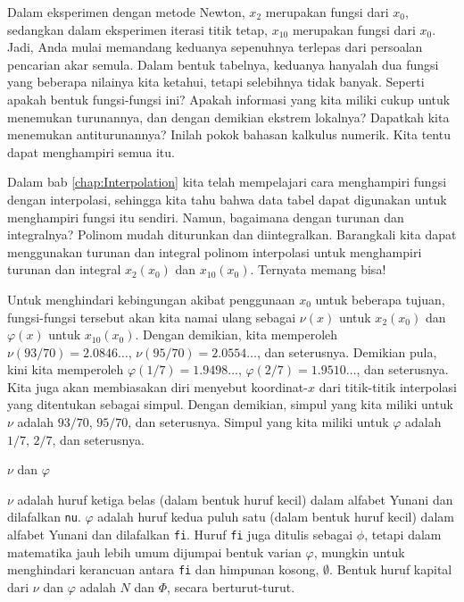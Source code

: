 Dalam eksperimen dengan metode Newton, $x_{2}$ merupakan fungsi dari
$x_{0}$, sedangkan dalam eksperimen iterasi titik tetap, $x_{10}$
merupakan fungsi dari $x_{0}$. Jadi, Anda mulai memandang keduanya
sepenuhnya terlepas dari persoalan pencarian akar semula. Dalam bentuk
tabelnya, keduanya hanyalah dua fungsi yang beberapa nilainya kita
ketahui, tetapi selebihnya tidak banyak. Seperti apakah bentuk fungsi-fungsi
ini? Apakah informasi yang kita miliki cukup untuk menemukan turunannya,
dan dengan demikian ekstrem lokalnya? Dapatkah kita menemukan antiturunannya?
Inilah pokok bahasan kalkulus numerik. Kita tentu dapat menghampiri
semua itu. 

Dalam bab \ref{chap:Interpolation} kita telah mempelajari cara menghampiri
fungsi dengan interpolasi, sehingga kita tahu bahwa data tabel dapat
digunakan untuk menghampiri fungsi itu sendiri. Namun, bagaimana dengan
turunan dan integralnya? Polinom mudah diturunkan dan diintegralkan.
Barangkali kita dapat menggunakan turunan dan integral polinom interpolasi
untuk menghampiri turunan dan integral $x_{2}(x_{0})$ dan $x_{10}(x_{0})$.
Ternyata memang bisa! 

Untuk menghindari kebingungan akibat penggunaan $x_{0}$ untuk beberapa
tujuan, fungsi-fungsi tersebut akan kita namai ulang sebagai $\nu(x)$
untuk $x_{2}(x_{0})$ dan $\varphi(x)$ untuk $x_{10}(x_{0})$. Dengan
demikian, kita memperoleh $\nu(93/70)=2.0846\ldots$, $\nu(95/70)=2.0554\ldots$,
dan seterusnya. Demikian pula, kini kita memperoleh $\varphi(1/7)=1.9498\ldots$,
$\varphi(2/7)=1.9510\ldots$, dan seterusnya. Kita juga akan membiasakan
diri menyebut koordinat-$x$ dari titik-titik interpolasi yang ditentukan
sebagai simpul. Dengan demikian, simpul yang kita miliki
untuk $\nu$ adalah $93/70$, $95/70$, dan seterusnya. Simpul yang
kita miliki untuk $\varphi$ adalah $1/7$, $2/7$, dan seterusnya.

\noindent\begin{digression}{$\nu$ dan $\varphi$} 

\noindent$\nu$ adalah huruf ketiga belas (dalam bentuk huruf kecil)
dalam alfabet Yunani dan dilafalkan \texttt{nu}. $\varphi$ adalah
huruf kedua puluh satu (dalam bentuk huruf kecil) dalam alfabet Yunani
dan dilafalkan \texttt{fi}. Huruf \texttt{fi} juga ditulis sebagai
$\phi$, tetapi dalam matematika jauh lebih umum dijumpai bentuk varian
$\varphi$, mungkin untuk menghindari kerancuan antara \texttt{fi}
dan himpunan kosong, $\emptyset$. Bentuk huruf kapital dari $\nu$
dan $\varphi$ adalah $N$ dan $\Phi$, secara berturut-turut.

\noindent\end{digression}

